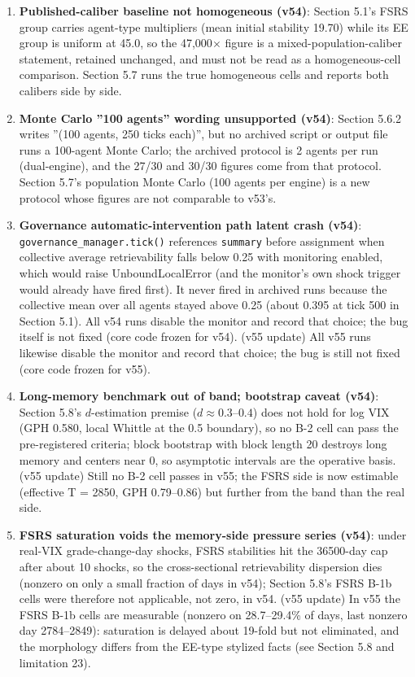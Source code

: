 \documentclass[11pt]{article}
\begin{document}
\begin{enumerate}
\item \textbf{Published-caliber baseline not homogeneous (v54)}: Section 5.1's FSRS group carries agent-type multipliers (mean initial stability 19.70) while its EE group is uniform at 45.0, so the 47,000$\times$ figure is a mixed-population-caliber statement, retained unchanged, and must not be read as a homogeneous-cell comparison. Section 5.7 runs the true homogeneous cells and reports both calibers side by side.
\item \textbf{Monte Carlo ''100 agents'' wording unsupported (v54)}: Section 5.6.2 writes ''(100 agents, 250 ticks each)'', but no archived script or output file runs a 100-agent Monte Carlo; the archived protocol is 2 agents per run (dual-engine), and the 27/30 and 30/30 figures come from that protocol. Section 5.7's population Monte Carlo (100 agents per engine) is a new protocol whose figures are not comparable to v53's.
\item \textbf{Governance automatic-intervention path latent crash (v54)}: \texttt{governance\_manager.tick()} references \texttt{summary} before assignment when collective average retrievability falls below 0.25 with monitoring enabled, which would raise UnboundLocalError (and the monitor's own shock trigger would already have fired first). It never fired in archived runs because the collective mean over all agents stayed above 0.25 (about 0.395 at tick 500 in Section 5.1). All v54 runs disable the monitor and record that choice; the bug itself is not fixed (core code frozen for v54). (v55 update) All v55 runs likewise disable the monitor and record that choice; the bug is still not fixed (core code frozen for v55).
\item \textbf{Long-memory benchmark out of band; bootstrap caveat (v54)}: Section 5.8's $d$-estimation premise ($d \approx 0.3$--$0.4$) does not hold for log VIX (GPH 0.580, local Whittle at the 0.5 boundary), so no B-2 cell can pass the pre-registered criteria; block bootstrap with block length 20 destroys long memory and centers near 0, so asymptotic intervals are the operative basis. (v55 update) Still no B-2 cell passes in v55; the FSRS side is now estimable (effective T = 2850, GPH 0.79--0.86) but further from the band than the real side.
\item \textbf{FSRS saturation voids the memory-side pressure series (v54)}: under real-VIX grade-change-day shocks, FSRS stabilities hit the 36500-day cap after about 10 shocks, so the cross-sectional retrievability dispersion dies (nonzero on only a small fraction of days in v54); Section 5.8's FSRS B-1b cells were therefore not applicable, not zero, in v54. (v55 update) In v55 the FSRS B-1b cells are measurable (nonzero on 28.7--29.4\% of days, last nonzero day 2784--2849): saturation is delayed about 19-fold but not eliminated, and the morphology differs from the EE-type stylized facts (see Section 5.8 and limitation 23).

\end{enumerate}
\end{document}
